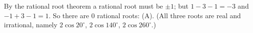 By the rational root theorem a rational root must be $\pm1$; but $1-3-1=-3$ and $-1+3-1=1$. So there are $\boxed{0}$ rational roots: (A). (All three roots are real and irrational, namely $2\cos20^\circ$, $2\cos140^\circ$, $2\cos260^\circ$.)
